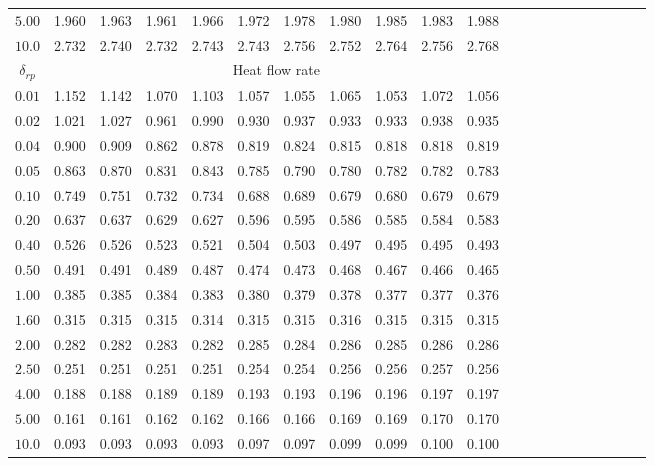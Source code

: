 \begin{table}[pt]
\begin{tabular}{ccccccccccccccccccccc}
		$5.00$ & 1.960& 1.963& 1.961& 1.966& 1.972& 1.978& 1.980& 1.985& 1.983& 1.988  \\
		$10.0$ & 2.732& 2.740& 2.732& 2.743& 2.743& 2.756& 2.752& 2.764& 2.756& 2.768  \\
		\hline
	$\delta_{rp}$ 	&  \multicolumn{10}{c}{Heat flow rate}    \\  \hline
		$0.01$ & 1.152& 1.142& 1.070& 1.103& 1.057& 1.055& 1.065& 1.053& 1.072& 1.056  \\
		$0.02$ & 1.021& 1.027& 0.961& 0.990& 0.930& 0.937& 0.933& 0.933& 0.938& 0.935  \\
		$0.04$ & 0.900& 0.909& 0.862& 0.878& 0.819& 0.824& 0.815& 0.818& 0.818& 0.819  \\
		$0.05$ & 0.863& 0.870& 0.831& 0.843& 0.785& 0.790& 0.780& 0.782& 0.782& 0.783  \\
		$0.10$ & 0.749& 0.751& 0.732& 0.734& 0.688& 0.689& 0.679& 0.680& 0.679& 0.679  \\
		$0.20$ & 0.637& 0.637& 0.629& 0.627& 0.596& 0.595& 0.586& 0.585& 0.584& 0.583 \\
		$0.40$ & 0.526& 0.526& 0.523& 0.521& 0.504& 0.503& 0.497& 0.495& 0.495& 0.493 \\
		$0.50$ & 0.491& 0.491& 0.489& 0.487& 0.474& 0.473& 0.468& 0.467& 0.466& 0.465  \\
		$1.00$ & 0.385& 0.385& 0.384& 0.383& 0.380& 0.379& 0.378& 0.377& 0.377& 0.376 \\
		$1.60$ & 0.315& 0.315& 0.315& 0.314& 0.315& 0.315& 0.316& 0.315& 0.315& 0.315  \\
		$2.00$ & 0.282& 0.282& 0.283& 0.282& 0.285& 0.284& 0.286& 0.285& 0.286& 0.286  \\
		$2.50$ & 0.251& 0.251& 0.251& 0.251& 0.254& 0.254& 0.256& 0.256& 0.257& 0.256  \\
		$4.00$ & 0.188& 0.188& 0.189& 0.189& 0.193& 0.193& 0.196& 0.196& 0.197& 0.197  \\
		$5.00$ & 0.161& 0.161& 0.162& 0.162& 0.166& 0.166& 0.169& 0.169& 0.170& 0.170  \\
		$10.0$ & 0.093& 0.093& 0.093& 0.093& 0.097& 0.097& 0.099& 0.099& 0.100& 0.100  \\
		\hline
	\end{tabular} 
	\label{table_poiseuille_lj_mass} 
\end{table}


